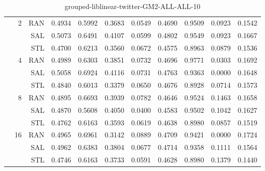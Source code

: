 \begin{center}
\begin{table}[htbp]
\begin{tabular}{ | r | r | r | r | r | r | r | r | r | r | r |}
 & \multirow{3}{*}{2} & RAN & 0.4934 & 0.5992 & 0.3683 & 0.0549 & 0.4690 & 0.9509 & 0.0923 & 0.1542\\ \cline{3-11}
 &   & SAL & 0.5073 & 0.6491 & 0.4107 & 0.0599 & 0.4802 & 0.9549 & 0.0923 & 0.1667\\ \cline{3-11}
 &   & STL & 0.4700 & 0.6213 & 0.3560 & 0.0672 & 0.4575 & 0.8963 & 0.0879 & 0.1536\\ \cline{2-11}
 & \multirow{3}{*}{4} & RAN & 0.4989 & 0.6303 & 0.3851 & 0.0732 & 0.4696 & 0.9771 & 0.0303 & 0.1692\\ \cline{3-11}
 &   & SAL & 0.5058 & 0.6924 & 0.4116 & 0.0731 & 0.4763 & 0.9363 & 0.0000 & 0.1648\\ \cline{3-11}
 &   & STL & 0.4840 & 0.6013 & 0.3379 & 0.0650 & 0.4676 & 0.8928 & 0.0714 & 0.1573\\ \cline{2-11}
 & \multirow{3}{*}{8} & RAN & 0.4895 & 0.6693 & 0.3939 & 0.0782 & 0.4646 & 0.9524 & 0.1463 & 0.1658\\ \cline{3-11}
 &   & SAL & 0.4870 & 0.5608 & 0.4050 & 0.0400 & 0.4583 & 0.9502 & 0.1042 & 0.1627\\ \cline{3-11}
 &   & STL & 0.4762 & 0.6163 & 0.3593 & 0.0619 & 0.4638 & 0.8980 & 0.0857 & 0.1519\\ \cline{2-11}
 & \multirow{3}{*}{16} & RAN & 0.4965 & 0.6961 & 0.3142 & 0.0889 & 0.4709 & 0.9421 & 0.0000 & 0.1724\\ \cline{3-11}
 &   & SAL & 0.4962 & 0.6383 & 0.3804 & 0.0677 & 0.4714 & 0.9358 & 0.1111 & 0.1564\\ \cline{3-11}
 &   & STL & 0.4746 & 0.6163 & 0.3733 & 0.0591 & 0.4628 & 0.8980 & 0.1379 & 0.1440\\ \cline{2-11}
\hline
\end{tabular}
\caption{grouped-liblinear-twitter-GM2-ALL-ALL-10}
\end{table}
\end{center}

